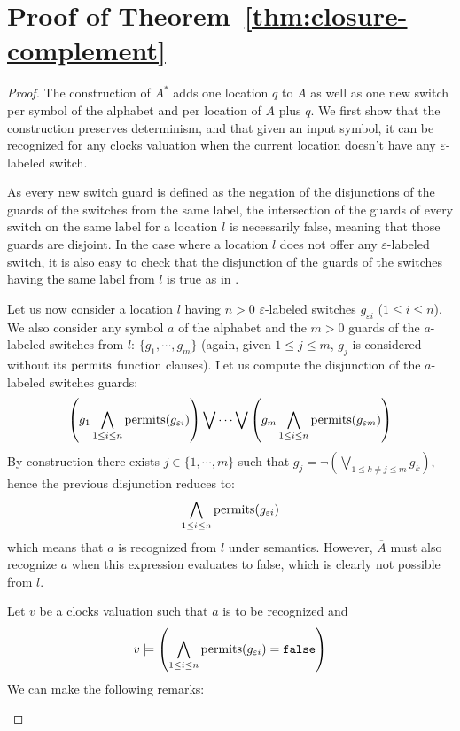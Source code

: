 \section{Proof of Theorem~\ref{thm:closure-complement}}


\begin{proof}
The construction of $A^*$ adds one location $q$ to $A$ as well as one new switch per symbol of the alphabet and per location of $A$ plus $q$. We first show that the construction preserves determinism, and that given an input symbol, it can be recognized for any clocks valuation when the current location doesn't have any $\varepsilon$-labeled switch.

As every new switch guard is defined as the negation of the disjunctions of the guards of the switches from the same label, the intersection of the guards of every switch on the same label for a location $l$ is necessarily false, meaning that those guards are disjoint. In the case where a location $l$ does not offer any $\varepsilon$-labeled switch, it is also easy to check that the disjunction of the guards of the switches having the same label from $l$ is true as in \cite{RADLD94}.

Let us now consider a location $l$ having $n > 0$ $\varepsilon$-labeled switches $g_{\varepsilon i}$ ($1 \leq i \leq n$). We also consider any symbol $a$ of the alphabet and the $m > 0$ guards of the $a$-labeled switches from $l$: $\{g_1, \cdots, g_m \}$ (again, given $1 \leq j \leq m$, $g_j$ is considered without its $\operatorname{permits}$ function clauses). Let us compute the disjunction of the $a$-labeled switches guards:
$$
  \left( g_1 \bigwedge\limits_{1 \leq i \leq n} \operatorname{permits}(g_{\varepsilon i}) \right)
  \bigvee \cdots \bigvee
  \left( g_m \bigwedge\limits_{1 \leq i \leq n} \operatorname{permits}(g_{\varepsilon m}) \right)
$$
By construction there exists $j \in \{1, \cdots, m\}$ such that $g_j = \neg \left( \bigvee\limits_{1 \leq k \neq j \leq m} g_k \right)$, hence the previous disjunction reduces to:
$$ \bigwedge\limits_{1 \leq i \leq n} \operatorname{permits}(g_{\varepsilon i}) $$
which means that $a$ is recognized from $l$ under \MInvoke semantics. However, $\overline{A}$ must also recognize $a$ when this expression evaluates to false, which is clearly not possible from $l$. 

Let $v$ be a clocks valuation such that $a$ is to be recognized and
$$ v \models \left( \bigwedge\limits_{1 \leq i \leq n} \operatorname{permits}(g_{\varepsilon i}) = \mathtt{false} \right)$$
We can make the following remarks:
\begin{enumerate}
  

\end{enumerate}
\end{proof}
